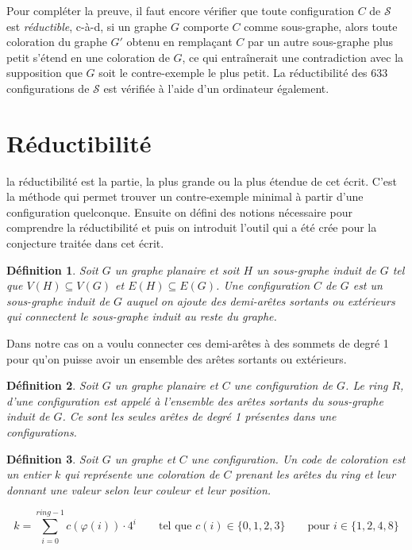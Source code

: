 \documentclass[10pt,a4paper]{article}
\newtheorem{definition}{Définition}
\begin{document}
Pour compléter la preuve, il faut encore vérifier que toute configuration $C$ de $\mathcal{S}$ est \emph{réductible}, c-à-d, si un graphe $G$ comporte $C$ comme sous-graphe, alors toute coloration du graphe $G'$ obtenu en remplaçant $C$ par un autre sous-graphe plus petit s'étend en une coloration de $G$, ce qui entraînerait une contradiction avec la supposition que $G$ soit le contre-exemple le plus petit.
La réductibilité des 633 configurations de $\mathcal{S}$ est vérifiée à l'aide d'un ordinateur également.

\newpage





\section{Réductibilité}

la réductibilité est la partie, la plus grande ou la plus étendue de cet écrit. C'est la méthode qui permet trouver un contre-exemple minimal à partir d'une configuration quelconque. Ensuite on défini des notions nécessaire pour comprendre la réductibilité et puis on introduit l'outil qui a été crée pour la conjecture traitée dans cet écrit.

\begin{definition}
Soit $G$ un graphe planaire et soit $H$ un sous-graphe induit de $G$ tel que $V(H) \subseteq V(G)$ et $E(H) \subseteq E(G)$. Une \emph{configuration} $C$ de $G$ est un sous-graphe induit de $G$ auquel on ajoute des demi-arêtes sortants ou extérieurs qui connectent le sous-graphe induit au reste du graphe.
\label{de:conf}
\end{definition}

{\color{red} Dans notre cas on a voulu connecter ces demi-arêtes à des sommets de degré 1 pour qu'on puisse avoir un ensemble des arêtes sortants ou extérieurs.}

\begin{definition}
Soit $G$ un graphe planaire et $C$ une configuration de $G$. Le \emph{ring}  $R$, d'une configuration est appelé à l'ensemble des arêtes sortants du sous-graphe induit de $G$. Ce sont les seules arêtes de degré 1 présentes dans une configurations.
\label{de:ring}
\end{definition}

\begin{definition}
Soit $G$ un graphe et $C$ une configuration. Un \emph{code} de coloration est un entier $k$ qui représente une coloration de $C$ prenant les arêtes du ring et leur donnant une valeur selon leur couleur et leur position.

$$
k = \sum_{i=0}^{ring-1} c(\varphi(i)) \cdot 4^{i} \qquad \textrm{tel que   } c(i) \in \lbrace 0,1,2,3 \rbrace \qquad \textrm{pour  } i \in \lbrace1,2,4,8 \rbrace
$$
\label{de:code}
\end{definition}
\end{document}
